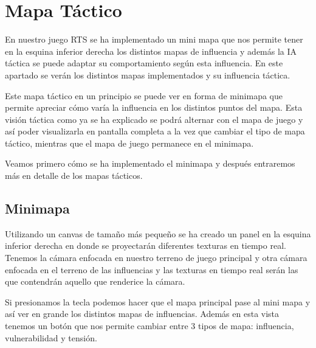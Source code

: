 \section{Mapa Táctico}

En nuestro juego RTS se ha implementado un mini mapa que nos permite tener en
la esquina inferior derecha los distintos mapas de influencia y además la IA táctica se
puede adaptar su comportamiento según esta influencia. En este apartado se verán los
distintos mapas implementados y su influencia táctica.

Este mapa táctico en un principio se puede ver en forma de minimapa que permite apreciar cómo varía la influencia en los distintos puntos del mapa. Esta visión táctica como ya se ha explicado se podrá alternar con el mapa de juego y así poder visualizarla en pantalla completa a la vez que cambiar el tipo de mapa táctico, mientras que el mapa de juego permanece en el minimapa.

Veamos primero cómo se ha implementado el minimapa y después entraremos más en detalle de los mapas tácticos.

\subsection{Minimapa}

Utilizando un canvas de tamaño más pequeño se ha creado un panel en la esquina inferior derecha en donde se proyectarán diferentes texturas en tiempo real. Tenemos la cámara enfocada en nuestro terreno de juego principal y otra cámara enfocada en el terreno de las influencias y las texturas en tiempo real serán las que contendrán aquello que renderice la cámara. 

Si presionamos la tecla  podemos hacer que el mapa principal pase al mini mapa y así ver en grande los distintos mapas de influencias.  Además en esta vista tenemos un botón que nos permite cambiar entre 3 tipos de mapa: influencia, vulnerabilidad y tensión.

